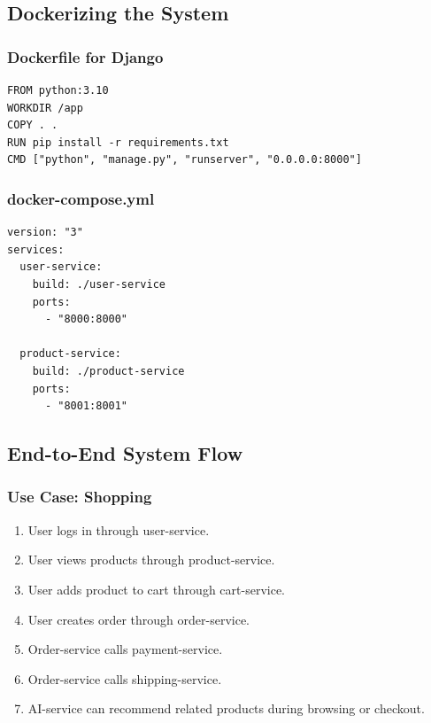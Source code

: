\documentclass[12pt,a4paper]{article}
\begin{document}
\subsection{Dockerizing the System}

\subsubsection{Dockerfile for Django}

\begin{lstlisting}[caption={Django Dockerfile.}]
FROM python:3.10
WORKDIR /app
COPY . .
RUN pip install -r requirements.txt
CMD ["python", "manage.py", "runserver", "0.0.0.0:8000"]
\end{lstlisting}

\subsubsection{docker-compose.yml}

\begin{lstlisting}[caption={Docker Compose sample.}]
version: "3"
services:
  user-service:
    build: ./user-service
    ports:
      - "8000:8000"

  product-service:
    build: ./product-service
    ports:
      - "8001:8001"
\end{lstlisting}

\subsection{End-to-End System Flow}

\subsubsection{Use Case: Shopping}

\begin{enumerate}[label=\arabic*.]
    \item User logs in through user-service.
    \item User views products through product-service.
    \item User adds product to cart through cart-service.
    \item User creates order through order-service.
    \item Order-service calls payment-service.
    \item Order-service calls shipping-service.
    \item AI-service can recommend related products during browsing or checkout.
\end{enumerate}
\end{document}
